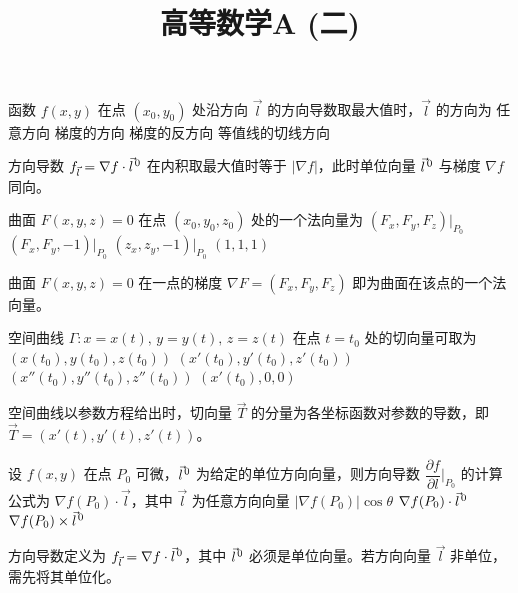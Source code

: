 \documentclass[answer]{THUExam}
\title{高等数学A (二)}
\author{}
\begin{document}
\vspace{1cm}
\makehead

\vspace{1cm}


\begin{problem}
函数 $f(x,y)$ 在点 $(x_0,y_0)$ 处沿方向 $\vec{l}$ 的方向导数取最大值时，$\vec{l}$ 的方向为
\options
{任意方向}
{梯度的方向}
{梯度的反方向}
{等值线的切线方向}
\end{problem}
\begin{note}
方向导数 $f_{\vec{l}}=\nabla f\cdot\vec{l}^{\kern1pt0}$ 在内积取最大值时等于 $|\nabla f|$，此时单位向量 $\vec{l}^{\kern1pt0}$ 与梯度 $\nabla f$ 同向。
\end{note}
\bigskip

\begin{problem}
曲面 $F(x,y,z)=0$ 在点 $(x_0,y_0,z_0)$ 处的一个法向量为
\options
{$(F_x,F_y,F_z)\big|_{P_0}$}
{$(F_x,F_y,-1)\big|_{P_0}$}
{$(z_x,z_y,-1)\big|_{P_0}$}
{$(1,1,1)$}
\end{problem}
\begin{note}
曲面 $F(x,y,z)=0$ 在一点的梯度 $\nabla F=(F_x,F_y,F_z)$ 即为曲面在该点的一个法向量。
\end{note}
\bigskip

\begin{problem}
空间曲线 $\varGamma:x=x(t),\,y=y(t),\,z=z(t)$ 在点 $t=t_0$ 处的切向量可取为
\options
{$(x(t_0),y(t_0),z(t_0))$}
{$(x'(t_0),y'(t_0),z'(t_0))$}
{$(x''(t_0),y''(t_0),z''(t_0))$}
{$(x'(t_0),0,0)$}
\end{problem}
\begin{note}
空间曲线以参数方程给出时，切向量 $\vec{T}$ 的分量为各坐标函数对参数的导数，即 $\vec{T}=(x'(t),y'(t),z'(t))$。
\end{note}
\bigskip

\begin{problem}
设 $f(x,y)$ 在点 $P_0$ 可微，$\vec{l}^{\kern1pt0}$ 为给定的单位方向向量，则方向导数 $\dfrac{\partial f}{\partial l}\Big|_{P_0}$ 的计算公式为
\options
{$\nabla f(P_0)\cdot\vec{l}$，其中 $\vec{l}$ 为任意方向向量}
{$|\nabla f(P_0)|\cos\theta$}
{$\nabla f(P_0)\cdot\vec{l}^{\kern1pt0}$}
{$\nabla f(P_0)\times\vec{l}^{\kern1pt0}$}
\end{problem}
\begin{note}
方向导数定义为 $f_{\vec{l}}=\nabla f\cdot\vec{l}^{\kern1pt0}$，其中 $\vec{l}^{\kern1pt0}$ 必须是单位向量。若方向向量 $\vec{l}$ 非单位，需先将其单位化。
\end{note}
\bigskip
\end{document}
